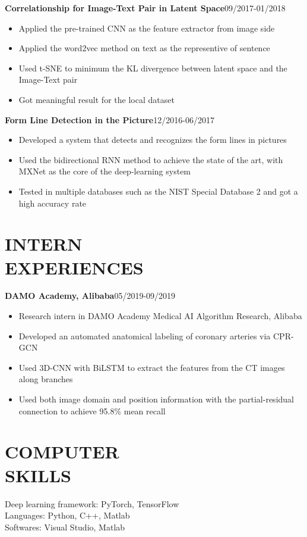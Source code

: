 \documentclass[margin]{res}
\begin{document}
\begin{resume}
                 \textbf{Correlationship for Image-Text Pair in Latent Space}\hfill 09/2017-01/2018
                \begin{itemize}\itemsep -2.2pt %
                 \item Applied the pre-trained CNN as the feature extractor from image side 
                 \item Applied the word2vec method on text as the representive of sentence
                 \item Used t-SNE to minimum the KL divergence between latent space and the Image-Text pair
                 \item Got meaningful result for the local dataset
                 \end{itemize}

                \textbf{Form Line Detection in the Picture}\hfill 12/2016-06/2017
                \begin{itemize}\itemsep -2.2pt %
                 \item Developed a system that detects and recognizes the form lines in pictures
                 \item Used the bidirectional RNN method to achieve the state of the art, with MXNet as the core of the deep-learning system
                 \item Tested in multiple databases such as the NIST Special Database 2 and got a high accuracy rate
                 \end{itemize}

\section{INTERN \\ EXPERIENCES}
                \textbf{DAMO Academy, Alibaba}\hfill 05/2019-09/2019
                \begin{itemize}\itemsep -2.2pt %
                 \item Research intern in DAMO Academy Medical AI Algorithm Research, Alibaba
                 \item Developed an automated anatomical labeling of coronary arteries via CPR-GCN
                 \item Used 3D-CNN with BiLSTM to extract the features from the CT images along branches
                 \item Used both image domain and position information with the partial-residual connection to achieve 95.8\% mean recall
                 \end{itemize}
\section{COMPUTER \\ SKILLS} 
Deep learning framework: PyTorch, TensorFlow\\
Languages: Python, C++, Matlab \\
Softwares: Visual Studio, Matlab 


\end{resume}
\end{document}
